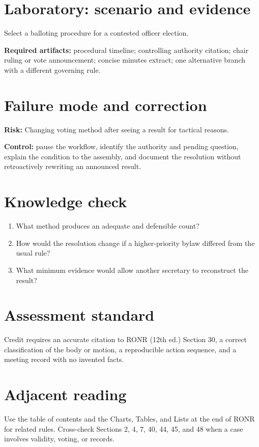 \documentclass[11pt]{article}
\begin{document}
\section{Laboratory: scenario and evidence}
Select a balloting procedure for a contested officer election.

\textbf{Required artifacts:} procedural timeline; controlling authority citation; chair ruling or vote announcement; concise minutes extract; one alternative branch with a different governing rule.

\section{Failure mode and correction}
\textbf{Risk:} Changing voting method after seeing a result for tactical reasons.

\textbf{Control:} pause the workflow, identify the authority and pending question, explain the condition to the assembly, and document the resolution without retroactively rewriting an announced result.

\section{Knowledge check}
\begin{enumerate}[leftmargin=*,itemsep=4pt]
\item What method produces an adequate and defensible count?
\item How would the resolution change if a higher-priority bylaw differed from the usual rule?
\item What minimum evidence would allow another secretary to reconstruct the result?
\end{enumerate}

\section{Assessment standard}
Credit requires an accurate citation to RONR (12th ed.) Section 30, a correct classification of the body or motion, a reproducible action sequence, and a meeting record with no invented facts.

\section{Adjacent reading}
Use the table of contents and the Charts, Tables, and Lists at the end of RONR for related rules. Cross-check Sections 2, 4, 7, 40, 44, 45, and 48 when a case involves validity, voting, or records.
\end{document}
